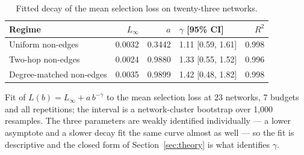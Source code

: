 \begin{table}[htbp]
\centering
\scriptsize
\caption{Fitted decay of the mean selection loss on twenty-three networks.}
\label{tab:decay}
\begin{tabular}{l r r l r}
\toprule
Regime & $L_\infty$ & $a$ & $\gamma$ [95\% CI] & $R^2$ \\
\midrule
Uniform non-edges & 0.0032 & 0.3442 & 1.11 [0.59, 1.61] & 0.998 \\
Two-hop non-edges & 0.0024 & 0.9880 & 1.33 [0.55, 1.52] & 0.996 \\
Degree-matched non-edges & 0.0035 & 0.9899 & 1.42 [0.48, 1.82] & 0.998 \\
\bottomrule
\end{tabular}
\par\vspace{2pt}\begin{minipage}{\linewidth}\footnotesize Fit of $L(b) = L_\infty + a\,b^{-\gamma}$ to the mean selection loss at 23 networks, 7 budgets and all repetitions; the interval is a network-cluster bootstrap over 1{,}000 resamples. The three parameters are weakly identified individually --- a lower asymptote and a slower decay fit the same curve almost as well --- so the fit is descriptive and the closed form of Section~\ref{sec:theory} is what identifies $\gamma$.\end{minipage}
\end{table}
